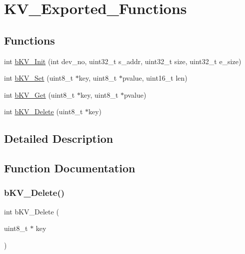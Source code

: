 \hypertarget{group___k_v___exported___functions}{}\section{K\+V\+\_\+\+Exported\+\_\+\+Functions}
\label{group___k_v___exported___functions}
\subsection*{Functions}
\begin{DoxyCompactItemize}
\item 
int \mbox{\hyperlink{group___k_v___exported___functions_ga6bc0d26dee41f9b4c623ba06c4d85125}{b\+K\+V\+\_\+\+Init}} (int dev\+\_\+no, uint32\+\_\+t s\+\_\+addr, uint32\+\_\+t size, uint32\+\_\+t e\+\_\+size)
\item 
int \mbox{\hyperlink{group___k_v___exported___functions_gaf484831f5c49d524f6bcdaf91dd3af4c}{b\+K\+V\+\_\+\+Set}} (uint8\+\_\+t $\ast$key, uint8\+\_\+t $\ast$pvalue, uint16\+\_\+t len)
\item 
int \mbox{\hyperlink{group___k_v___exported___functions_ga861289304680d05e55bccecd7d25d86d}{b\+K\+V\+\_\+\+Get}} (uint8\+\_\+t $\ast$key, uint8\+\_\+t $\ast$pvalue)
\item 
int \mbox{\hyperlink{group___k_v___exported___functions_gacddcf86cd22518488e048afe3e31a9fa}{b\+K\+V\+\_\+\+Delete}} (uint8\+\_\+t $\ast$key)
\end{DoxyCompactItemize}


\subsection{Detailed Description}


\subsection{Function Documentation}
\mbox{\label{group___k_v___exported___functions_gacddcf86cd22518488e048afe3e31a9fa}} 
\subsubsection{\texorpdfstring{b\+K\+V\+\_\+\+Delete()}{bKV\_Delete()}}
{\footnotesize\ttfamily int b\+K\+V\+\_\+\+Delete (\begin{DoxyParamCaption}\item[{uint8\+\_\+t $\ast$}]{key }\end{DoxyParamCaption})}

